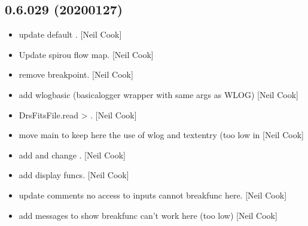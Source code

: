 \documentclass[a4paper,10pt,english]{report}
\begin{document}
\subsection{0.6.029 (2020\sphinxhyphen{}01\sphinxhyphen{}27)}
\label{\detokenize{misc/changelog:id9}}\begin{itemize}
\item {} 
 \sphinxhyphen{} update default
. {[}Neil Cook{]}

\item {} 
Update spirou flow map. {[}Neil Cook{]}

\item {} 
 \sphinxhyphen{} remove breakpoint. {[}Neil
Cook{]}

\item {} 
 \sphinxhyphen{} add wlogbasic (basicalogger wrapper
with same args as WLOG) {[}Neil Cook{]}

\item {} 
DrsFitsFile.read \textendash{}\textgreater{} . {[}Neil Cook{]}

\item {} 
 \sphinxhyphen{} move  main to  \sphinxhyphen{}
keep here the use of wlog and textentry (too low in 
{[}Neil Cook{]}

\item {} 
 \sphinxhyphen{} add  and change .
{[}Neil Cook{]}

\item {} 
 \sphinxhyphen{} add display funcs. {[}Neil Cook{]}

\item {} 
 \sphinxhyphen{} update  comments \sphinxhyphen{} no access to
inputs cannot breakfunc here. {[}Neil Cook{]}

\item {} 
 \sphinxhyphen{} add messages to show 
breakfunc can’t work here (too low) {[}Neil Cook{]}


\end{itemize}
\end{document}
